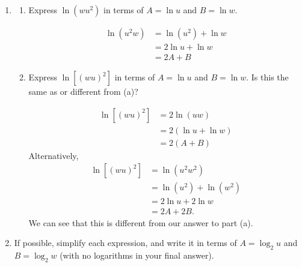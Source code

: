 \documentclass{article}
\begin{document}
\begin{enumerate}[resume]
\item 

  \begin{enumerate}
  \item
    \begin{problem}[\vfill]
      Express $\ln(w u^2)$ in terms of $A = \ln u$ and $B = \ln w$.
    \end{problem}

    \begin{solution}
      \begin{align*}
        \ln \left( u^2 w \right) &= \ln \left( u^2 \right) + \ln w \\
        &= 2 \ln u + \ln w \\
        &= \boxed{2A + B}
      \end{align*}
    \end{solution}

  \item
    \begin{problem}[\vfill]
      Express $\ln \left[ (wu)^2 \right]$ in terms of $A = \ln u$ and $B = \ln w$. Is this the same as or different from (a)?
    \end{problem}

    \begin{solution}
    \begin{align*}
          \ln \left[ (wu)^2 \right] &= 2\ln\left(uw\right) \\
          &= 2(\ln u + \ln w )\\
          &= \boxed{2(A + B)}
      \end{align*}
      Alternatively,
      \begin{align*}
          \ln \left[ (wu)^2 \right] &= \ln\left(u^2 w^2\right) \\
          &= \ln(u^2) + \ln (w^2) \\
          &= 2\ln u + 2\ln w \\
          &= 2A + 2B.
      \end{align*}
      We can see that this is different from our answer to part (a).
    \end{solution}

  \end{enumerate}

\item  If possible, simplify each expression, and write it in terms of $A =
  \log_2 u$ and $B = \log_2 w$ (with no logarithms in your final answer). 


\end{enumerate}
\end{document}
